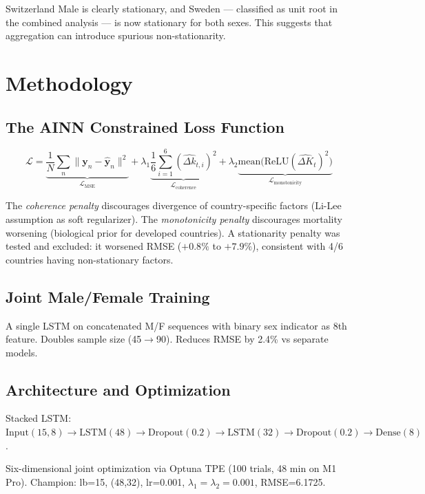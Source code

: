 \documentclass[11pt,a4paper]{article}
\begin{document}
Switzerland Male is clearly stationary, and Sweden --- classified as unit root in the combined analysis --- is now stationary for both sexes. This suggests that aggregation can introduce spurious non-stationarity.

\section{Methodology}

\subsection{The AINN Constrained Loss Function}

\begin{equation}\label{eq:ainn_loss}
    \mathcal{L} = \underbrace{\frac{1}{N}\sum_{n} \| \mathbf{y}_n - \hat{\mathbf{y}}_n \|^2}_{\mathcal{L}_{\text{MSE}}} + \lambda_1 \underbrace{\frac{1}{6}\sum_{i=1}^{6} (\hat{\Delta k}_{t,i})^2}_{\mathcal{L}_{\text{coherence}}} + \lambda_2 \underbrace{\text{mean}\big(\text{ReLU}(\hat{\Delta K}_t)^2\big)}_{\mathcal{L}_{\text{monotonicity}}}
\end{equation}

The \textit{coherence penalty} discourages divergence of country-specific factors (Li-Lee assumption as soft regularizer). The \textit{monotonicity penalty} discourages mortality worsening (biological prior for developed countries). A stationarity penalty was tested and excluded: it worsened RMSE ($+0.8\%$ to $+7.9\%$), consistent with 4/6 countries having non-stationary factors.

\subsection{Joint Male/Female Training}

A single LSTM on concatenated M/F sequences with binary sex indicator as 8th feature. Doubles sample size (45$\to$90). Reduces RMSE by 2.4\% vs separate models.

\subsection{Architecture and Optimization}

Stacked LSTM: $\text{Input}(15, 8) \to \text{LSTM}(48) \to \text{Dropout}(0.2) \to \text{LSTM}(32) \to \text{Dropout}(0.2) \to \text{Dense}(8)$.

Six-dimensional joint optimization via Optuna TPE \cite{optuna2019} (100 trials, 48 min on M1 Pro). Champion: lb=15, (48,32), lr=0.001, $\lambda_1 = \lambda_2 = 0.001$, RMSE=6.1725.
\end{document}
